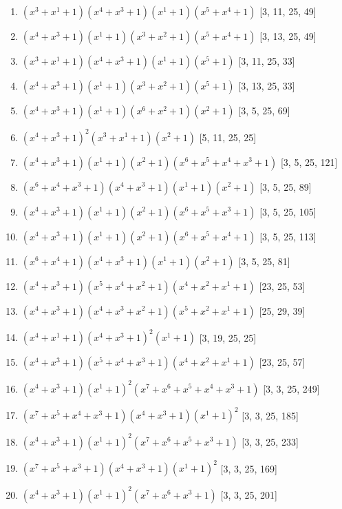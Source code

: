 \documentclass[10pt,twocolumn]{article}
\begin{document}
\begin{enumerate}
\item $(x^{3} + x^{1} + 1)(x^{4} + x^{3} + 1)(x^{1} + 1)(x^{5} + x^{4} + 1)$  [3, 11, 25, 49]
\item $(x^{4} + x^{3} + 1)(x^{1} + 1)(x^{3} + x^{2} + 1)(x^{5} + x^{4} + 1)$  [3, 13, 25, 49]
\item $(x^{3} + x^{1} + 1)(x^{4} + x^{3} + 1)(x^{1} + 1)(x^{5} + 1)$  [3, 11, 25, 33]
\item $(x^{4} + x^{3} + 1)(x^{1} + 1)(x^{3} + x^{2} + 1)(x^{5} + 1)$  [3, 13, 25, 33]
\item $(x^{4} + x^{3} + 1)(x^{1} + 1)(x^{6} + x^{2} + 1)(x^{2} + 1)$  [3, 5, 25, 69]
\item $(x^{4} + x^{3} + 1)^{2}(x^{3} + x^{1} + 1)(x^{2} + 1)$  [5, 11, 25, 25]
\item $(x^{4} + x^{3} + 1)(x^{1} + 1)(x^{2} + 1)(x^{6} + x^{5} + x^{4} + x^{3} + 1)$  [3, 5, 25, 121]
\item $(x^{6} + x^{4} + x^{3} + 1)(x^{4} + x^{3} + 1)(x^{1} + 1)(x^{2} + 1)$  [3, 5, 25, 89]
\item $(x^{4} + x^{3} + 1)(x^{1} + 1)(x^{2} + 1)(x^{6} + x^{5} + x^{3} + 1)$  [3, 5, 25, 105]
\item $(x^{4} + x^{3} + 1)(x^{1} + 1)(x^{2} + 1)(x^{6} + x^{5} + x^{4} + 1)$  [3, 5, 25, 113]
\item $(x^{6} + x^{4} + 1)(x^{4} + x^{3} + 1)(x^{1} + 1)(x^{2} + 1)$  [3, 5, 25, 81]
\item $(x^{4} + x^{3} + 1)(x^{5} + x^{4} + x^{2} + 1)(x^{4} + x^{2} + x^{1} + 1)$  [23, 25, 53]
\item $(x^{4} + x^{3} + 1)(x^{4} + x^{3} + x^{2} + 1)(x^{5} + x^{2} + x^{1} + 1)$  [25, 29, 39]
\item $(x^{4} + x^{1} + 1)(x^{4} + x^{3} + 1)^{2}(x^{1} + 1)$  [3, 19, 25, 25]
\item $(x^{4} + x^{3} + 1)(x^{5} + x^{4} + x^{3} + 1)(x^{4} + x^{2} + x^{1} + 1)$  [23, 25, 57]
\item $(x^{4} + x^{3} + 1)(x^{1} + 1)^{2}(x^{7} + x^{6} + x^{5} + x^{4} + x^{3} + 1)$  [3, 3, 25, 249]
\item $(x^{7} + x^{5} + x^{4} + x^{3} + 1)(x^{4} + x^{3} + 1)(x^{1} + 1)^{2}$  [3, 3, 25, 185]
\item $(x^{4} + x^{3} + 1)(x^{1} + 1)^{2}(x^{7} + x^{6} + x^{5} + x^{3} + 1)$  [3, 3, 25, 233]
\item $(x^{7} + x^{5} + x^{3} + 1)(x^{4} + x^{3} + 1)(x^{1} + 1)^{2}$  [3, 3, 25, 169]
\item $(x^{4} + x^{3} + 1)(x^{1} + 1)^{2}(x^{7} + x^{6} + x^{3} + 1)$  [3, 3, 25, 201]

\end{enumerate}
\end{document}

